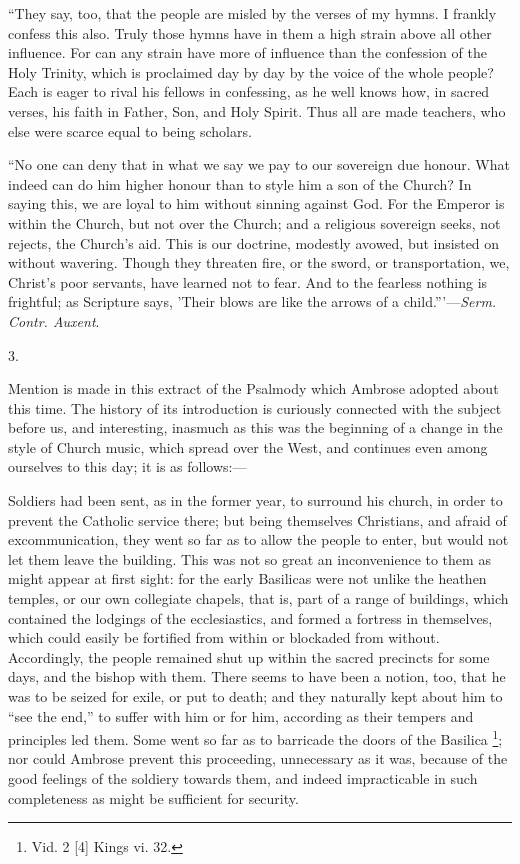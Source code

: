 ``They say, too, that the people are misled by the verses of my
hymns. I frankly confess this also. Truly those hymns have in them a
high strain above all other influence. For can any strain have more of
influence than the confession of the Holy Trinity, which is proclaimed
day by day by the voice of the whole people? Each is eager to rival
his fellows in confessing, as he well knows how, in sacred verses, his
faith in Father, Son, and Holy Spirit. Thus all are made teachers, who
else were scarce equal to being scholars.

``No one can deny that in what we say we pay to our sovereign
due honour. What indeed can do him higher honour than to style him a
son of the Church? In saying this, we are loyal to him without sinning
against God. For the Emperor is within the Church, but not over the
Church; and a religious sovereign seeks, not rejects, the Church's
aid. This is our doctrine, modestly avowed, but insisted on without
wavering. Though they threaten fire, or the sword, or transportation,
we, Christ's poor servants, have learned not to fear. And to the
fearless nothing is frightful; as Scripture says, 'Their blows are
like the arrows of a child.'''—\emph{Serm. Contr. Auxent}.

3.

Mention is made in this extract of the Psalmody which Ambrose
adopted about this time. The history of its introduction is curiously
connected with the subject before us, and interesting, inasmuch as
this was the beginning of a change in the style of Church music, which
spread over the West, and continues even among ourselves to this day;
it is as follows:—

Soldiers had been sent, as in the former year, to surround his
church, in order to prevent the Catholic service there; but being
themselves Christians, and afraid of excommunication, they went so far
as to allow the people to enter, but would not let them leave the
building. This was not so great an inconvenience to them as might
appear at first sight: for the early Basilicas were not unlike the
heathen temples, or our own collegiate chapels, that is, part of a
range of buildings, which contained the lodgings of the ecclesiastics,
and formed a fortress in themselves, which could easily be fortified
from within or blockaded from without. Accordingly, the people
remained shut up within the sacred precincts for some days, and the
bishop with them. There seems to have been a notion, too, that he was
to be seized for exile, or put to death; and they naturally kept about
him to ``see the end,'' to suffer with him or for him,
according as their tempers and principles led them. Some went so far
as to barricade the doors of the Basilica \footnote{Vid. 2 [4]
Kings vi. 32.}; nor could Ambrose prevent this proceeding, unnecessary as it
was, because of the good feelings of the soldiery towards them, and
indeed impracticable in such completeness as might be sufficient for
security.

